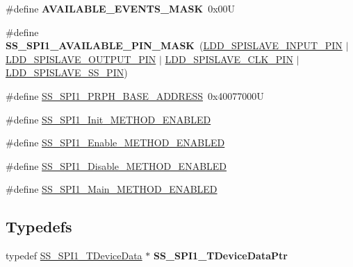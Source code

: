 \begin{DoxyCompactItemize}
\item 
\hypertarget{group___s_s___s_p_i1__module_ga5f04a8830cd52a3ffa1678d113f31aee}{\#define {\bfseries A\-V\-A\-I\-L\-A\-B\-L\-E\-\_\-\-E\-V\-E\-N\-T\-S\-\_\-\-M\-A\-S\-K}~0x00\-U}\label{group___s_s___s_p_i1__module_ga5f04a8830cd52a3ffa1678d113f31aee}

\item 
\hypertarget{group___s_s___s_p_i1__module_ga8d7637fb717e457b529135b4a75f7fd6}{\#define {\bfseries S\-S\-\_\-\-S\-P\-I1\-\_\-\-A\-V\-A\-I\-L\-A\-B\-L\-E\-\_\-\-P\-I\-N\-\_\-\-M\-A\-S\-K}~(\hyperlink{group___p_e___types__module_ga073542f5b2a49dca62e3eeb042f63909}{L\-D\-D\-\_\-\-S\-P\-I\-S\-L\-A\-V\-E\-\_\-\-I\-N\-P\-U\-T\-\_\-\-P\-I\-N} $|$ \hyperlink{group___p_e___types__module_ga7cf4950dd3ffdf321903de20719bdd60}{L\-D\-D\-\_\-\-S\-P\-I\-S\-L\-A\-V\-E\-\_\-\-O\-U\-T\-P\-U\-T\-\_\-\-P\-I\-N} $|$ \hyperlink{group___p_e___types__module_ga2b1fbaeec45990b4da5598609754233b}{L\-D\-D\-\_\-\-S\-P\-I\-S\-L\-A\-V\-E\-\_\-\-C\-L\-K\-\_\-\-P\-I\-N} $|$ \hyperlink{group___p_e___types__module_ga9a25bc45156156e5c9c1ba6d3f6ec840}{L\-D\-D\-\_\-\-S\-P\-I\-S\-L\-A\-V\-E\-\_\-\-S\-S\-\_\-\-P\-I\-N})}\label{group___s_s___s_p_i1__module_ga8d7637fb717e457b529135b4a75f7fd6}

\item 
\#define \hyperlink{group___s_s___s_p_i1__module_gac117f57c8f9e0238a02b594f3bdcde0b}{S\-S\-\_\-\-S\-P\-I1\-\_\-\-P\-R\-P\-H\-\_\-\-B\-A\-S\-E\-\_\-\-A\-D\-D\-R\-E\-S\-S}~0x40077000\-U
\item 
\#define \hyperlink{group___s_s___s_p_i1__module_gade2dd3e2682456b1d9679d827f38a027}{S\-S\-\_\-\-S\-P\-I1\-\_\-\-Init\-\_\-\-M\-E\-T\-H\-O\-D\-\_\-\-E\-N\-A\-B\-L\-E\-D}
\item 
\#define \hyperlink{group___s_s___s_p_i1__module_ga90b6abc4c5866ee300491a6395045a5c}{S\-S\-\_\-\-S\-P\-I1\-\_\-\-Enable\-\_\-\-M\-E\-T\-H\-O\-D\-\_\-\-E\-N\-A\-B\-L\-E\-D}
\item 
\#define \hyperlink{group___s_s___s_p_i1__module_gaa33ae62c28224145aa9b963b72c74071}{S\-S\-\_\-\-S\-P\-I1\-\_\-\-Disable\-\_\-\-M\-E\-T\-H\-O\-D\-\_\-\-E\-N\-A\-B\-L\-E\-D}
\item 
\#define \hyperlink{group___s_s___s_p_i1__module_gae1cf15fa8d6199a567ce41961c5bb05f}{S\-S\-\_\-\-S\-P\-I1\-\_\-\-Main\-\_\-\-M\-E\-T\-H\-O\-D\-\_\-\-E\-N\-A\-B\-L\-E\-D}
\end{DoxyCompactItemize}
\subsection*{Typedefs}
\begin{DoxyCompactItemize}
\item 
\hypertarget{group___s_s___s_p_i1__module_ga8ad1ea2d70fc3b8d2b9ea2c601f10065}{typedef \hyperlink{struct_s_s___s_p_i1___t_device_data}{S\-S\-\_\-\-S\-P\-I1\-\_\-\-T\-Device\-Data} $\ast$ {\bfseries S\-S\-\_\-\-S\-P\-I1\-\_\-\-T\-Device\-Data\-Ptr}}\label{group___s_s___s_p_i1__module_ga8ad1ea2d70fc3b8d2b9ea2c601f10065}

\end{DoxyCompactItemize}
